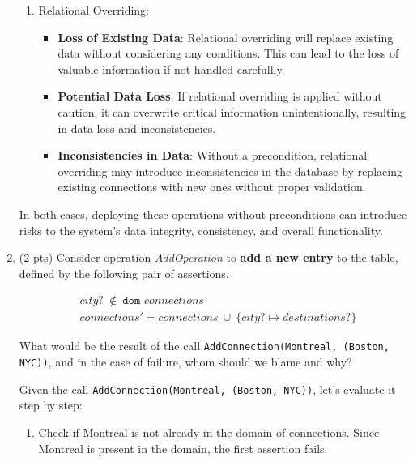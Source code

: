 \documentclass[12pt]{article}
\begin{document}
\begin{spacing}{1.5}
\begin{enumerate}
\begin{enumerate}
            \item Relational Overriding:
            \begin{itemize}
                \item \textbf{Loss of Existing Data}: Relational overriding will replace existing data without considering any conditions. This can lead to the loss of valuable information if not handled carefullly.

                \item \textbf{Potential Data Loss}: If relational overriding is applied without caution, it can overwrite critical information unintentionally, resulting in data loss and inconsistencies.

                \item \textbf{Inconsistencies in Data}: Without a precondition, relational overriding may introduce inconsistencies in the database by replacing existing connections with new ones without proper validation.
            \end{itemize}
        \end{enumerate}

         In both cases, deploying these operations without preconditions can introduce risks to the system's data integrity, consistency, and overall functionality.
         
		\item (2 pts) Consider operation \textit{AddOperation} to \textbf{add a new entry} to the table, defined by the following pair of assertions.
		      
		      \begin{align*}
		      	  & city? \: \notin \: \texttt{dom } connections                           \\
		      	  & connections' = connections \: \cup \: \{city? \mapsto destinations?\} 
		      \end{align*}
		      
		      What would be the result of the call \texttt{AddConnection(Montreal, (Boston, NYC))}, and in the case of failure, whom should we blame and why?\newline

            Given the call \texttt{AddConnection(Montreal, (Boston, NYC))}, let's evaluate it step by step:


            \begin{enumerate}
                \item Check if Montreal is not already in the domain of connections. Since Montreal is present in the domain, the first assertion fails.


\end{enumerate}
\end{enumerate}
\end{spacing}
\end{document}
